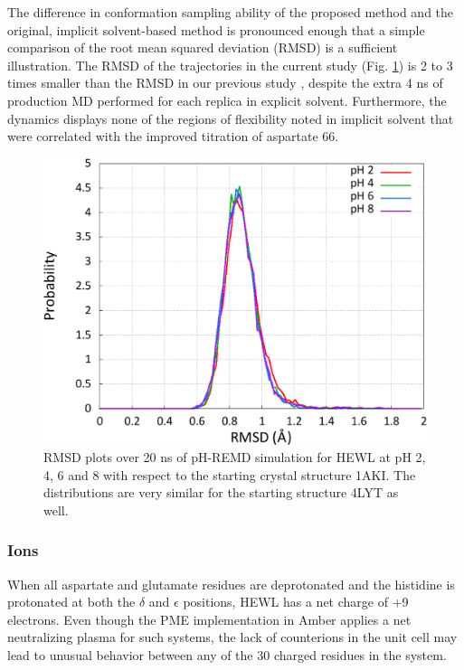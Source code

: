 The difference in conformation sampling ability of the proposed method and the
original, implicit solvent-based method is pronounced enough that a simple
comparison of the root mean squared deviation (RMSD) is a sufficient
illustration. The RMSD of the trajectories in the current study
(Fig. \ref{fig4:hewl_rmsd}) is 2 to 3 times smaller than the RMSD in our
previous study \cite{Swails_JChemTheoryComput_2012_v8_p4393}, despite the extra
4 ns of production MD performed for each replica in explicit solvent.
Furthermore, the dynamics displays none of the regions of flexibility noted in
implicit solvent that were correlated with the improved titration of aspartate
66. \cite{Swails_JChemTheoryComput_2012_v8_p4393}

\begin{figure}
   \includegraphics[width=6.5in]{1AKI_RMSDs.eps}
   \caption{RMSD plots over 20 ns of pH-REMD simulation for HEWL at pH 2, 4, 6
            and 8 with respect to the starting crystal structure 1AKI. The
            distributions are very similar for the starting structure 4LYT as
            well.}
   \label{fig4:hewl_rmsd}
\end{figure}

\subsubsection*{Ions}

When all aspartate and glutamate residues are deprotonated and the histidine is
protonated at both the $\delta$ and $\epsilon$ positions, HEWL has a net charge
of +9 electrons. Even though the PME implementation in Amber applies a net
neutralizing plasma for such systems, the lack of counterions in the unit cell
may lead to unusual behavior between any of the 30 charged residues in the
system.

